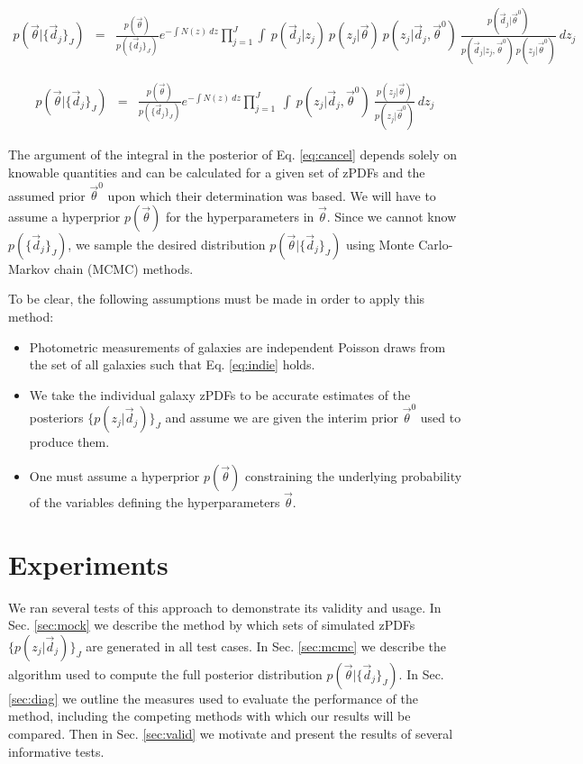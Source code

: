 \documentclass[preprint]{aastex}
\begin{document}
\begin{eqnarray}
\label{eq:expand}
p(\vec{\theta}|\{\vec{d}_{j}\}_{J}) &=& \frac{p(\vec{\theta})}{p(\{\vec{d}_{j}\}_{J})}e^{-\int N(z)\ dz}\prod_{j=1}^{J}\int\ p(\vec{d}_{j}|z_{j})\ p(z_{j}|\vec{\theta})\ p(z_{j}|\vec{d}_{j},\vec{\theta}^{0})\ \frac{p(\vec{d}_{j}|\vec{\theta}^{0})}{p(\vec{d}_{j}|z_{j},\vec{\theta}^{0})\ p(z_{j}|\vec{\theta}^{0})}\ dz_{j}
\end{eqnarray}

\begin{eqnarray}
\label{eq:cancel}
p(\vec{\theta}|\{\vec{d}_{j}\}_{J}) &=& \frac{p(\vec{\theta})}{p(\{\vec{d}_{j}\}_{J})}e^{-\int N(z)\ dz}\prod_{j=1}^{J}\ \int\ p(z_{j}|\vec{d}_{j},\vec{\theta}^{0})\ \frac{p(z_{j}|\vec{\theta})}{p(z_{j}|\vec{\theta}^{0})}\ dz_{j}
\end{eqnarray}

The argument of the integral in the posterior of Eq. \ref{eq:cancel} depends solely on knowable quantities and can be calculated for a given set of zPDFs and the assumed prior $\vec{\theta}^{0}$ upon which their determination was based.  We will have to assume a hyperprior $p(\vec{\theta})$ for the hyperparameters in $\vec{\theta}$.  Since we cannot know $p(\{\vec{d}_{j}\}_{J})$, we sample the desired distribution $p(\vec{\theta}|\{\vec{d}_{j}\}_{J})$ using Monte Carlo-Markov chain (MCMC) methods.  

To be clear, the following assumptions must be made in order to apply this method:

\begin{itemize}
\item Photometric measurements of galaxies are independent Poisson draws from the set of all galaxies such that Eq. \ref{eq:indie} holds.
\item We take the individual galaxy zPDFs to be accurate estimates of the posteriors $\{p(z_{j}|\vec{d}_{j})\}_{J}$ and assume we are given the interim prior $\vec{\theta}^{0}$ used to produce them.
\item One must assume a hyperprior $p(\vec{\theta})$ constraining the underlying probability of the variables defining the hyperparameters $\vec{\theta}$.
\end{itemize}

\section{Experiments}
\label{sec:exp}

We ran several tests of this approach to demonstrate its validity and usage.  In Sec. \ref{sec:mock} we describe the method by which sets of simulated zPDFs $\{p(z_{j}|\vec{d}_{j})\}_{J}$ are generated in all test cases.  In Sec. \ref{sec:mcmc} we describe the algorithm used to compute the full posterior distribution $p(\vec{\theta}|\{\vec{d}_{j}\}_{J})$.  In Sec. \ref{sec:diag} we outline the measures used to evaluate the performance of the method, including the competing methods with which our results will be compared.  Then in Sec. \ref{sec:valid} we motivate and present the results of several informative tests.
\end{document}

